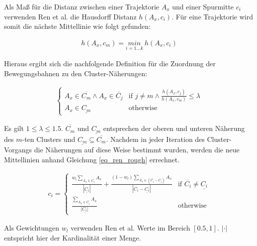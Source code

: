 Als Maß für die Distanz zwischen einer Trajektorie $A_x$ und einer Spurmitte $c_i$ verwenden Ren et al. die
Hausdorff Distanz $h(A_x, c_i)$. Für eine Trajektorie wird somit die nächste Mittellinie wie folgt gefunden:

\begin{ceqn}
\begin{align}
    h(A_x, c_m) = \underset{i = 1 ... k}{min}\ h(A_x, c_i)
\end{align}
\end{ceqn}

Hieraus ergibt sich die nachfolgende Definition für die Zuordnung der Bewegungsbahnen zu den Cluster-Näherungen:

\begin{ceqn}
\begin{align}
    \begin{cases}
        A_x \in \overline{C_m} \land A_x \in \overline{C_j} & \text{if } j \neq m \land \frac{h(A_x, c_j)}{h(A_x, c_m)} \leq \lambda \\
        A_x \in \underline{C_m} & \text{otherwise}
    \end{cases}
\end{align}
\end{ceqn}

Es gilt $1 \leq \lambda \leq 1.5$. $\overline{C_m}$ und $\underline{C_m}$ entsprechen der oberen und unteren
Näherung des $m$-ten Clusters und $\underline{C_m} \subseteq \overline{C_m}$.
Nachdem in jeder Iteration des Cluster-Vorgangs die Näherungen auf diese Weise bestimmt wurden, werden die neue Mittellinien
anhand Gleichung \ref{eq_ren_rough} errechnet.

\begin{ceqn}
\begin{align}
    \label{eq_ren_rough}
    c_i =
    \begin{cases}
        \frac{w_l \sum_{A_x \in \underline{C_i}} A_x}{|\underline{C_i}|} + \frac{(1 - w_l) \sum_{A_x \in (\overline{C_i} - \underline{C_i})} A_x}{|\overline{C_i} - \underline{C_i}|} & \text{if } \overline{C_i} \neq \underline{C_i} \\
        \frac{\sum_{A_x \in \underline{C_i}} A_x}{|\underline{C_i|}} & \text{otherwise}
    \end{cases}
\end{align}
\end{ceqn}

Als Gewichtungen $w_l$ verwenden Ren et al. Werte im Bereich $[0.5, 1]$. $| \cdot |$ entspricht hier der Kardinalität einer Menge.

